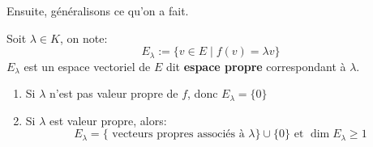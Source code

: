Ensuite, généralisons ce qu'on a fait. 
\begin{definition}
    Soit $\lambda \in K$, on note:
    \[
        E_{\lambda} := \{v \in E \mid f(v) = \lambda v \}
    \] 
    $E_{\lambda}$ est un espace vectoriel de $E$ dit  \textbf{espace propre} correspondant à $\lambda$.
\end{definition}
\begin{remark}
   \begin{enumerate}
       \item Si $\lambda$ n'est pas valeur propre de $f$, donc  $E_\lambda = \{0\}$
       \item Si  $\lambda$ est valeur propre, alors:
            \[
                E_\lambda = \{ \text{ vecteurs propres associés à } \lambda \} \cup \{0\} \text{ et } \dim E_\lambda \ge 1
           \] 
   \end{enumerate} 
\end{remark}


